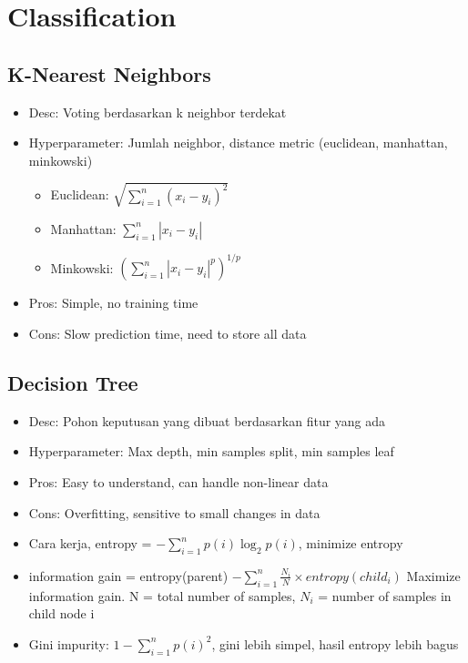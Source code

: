 \documentclass[conference]{IEEEtran}
\begin{document}
\section{Classification}

\subsection{K-Nearest Neighbors}

\begin{itemize}
    \item Desc: Voting berdasarkan k neighbor terdekat
    \item Hyperparameter: Jumlah neighbor, distance metric (euclidean, manhattan, minkowski)
    \begin{itemize}
        \item Euclidean: \(\sqrt{\sum_{i=1}^{n} (x_i - y_i)^2}\)
        \item Manhattan: \(\sum_{i=1}^{n} |x_i - y_i|\)
        \item Minkowski: \((\sum_{i=1}^{n} |x_i - y_i|^p)^{1/p}\)
    \end{itemize}
    \item Pros: Simple, no training time
    \item Cons: Slow prediction time, need to store all data
\end{itemize}

\subsection{Decision Tree}

\begin{itemize}
    \item Desc: Pohon keputusan yang dibuat berdasarkan fitur yang ada
    \item Hyperparameter: Max depth, min samples split, min samples leaf
    \item Pros: Easy to understand, can handle non-linear data
    \item Cons: Overfitting, sensitive to small changes in data
    \item Cara kerja, entropy = \(-\sum_{i=1}^{n} p(i) \log_2 p(i)\), minimize entropy
    \item information gain = 
    entropy(parent) \( - \sum_{i=1}^{n} \frac{N_i}{N} \times entropy(child_i)\) Maximize information gain. N = total number of samples, \(N_i\) = number of samples in child node i
    \item Gini impurity: \(1 - \sum_{i=1}^{n} p(i)^2\), gini lebih simpel, hasil entropy lebih bagus
\end{itemize}
\end{document}
